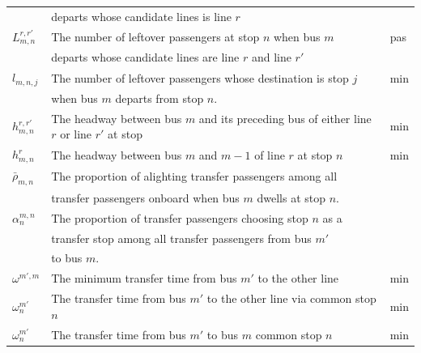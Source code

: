 \documentclass[smallextended]{svjour3}       %
\begin{document}
\begin{Abstract}
\begin{table}[H]
\begin{tabular}{p{1.5cm}p{7cm}p{1.1cm}}
                                    & departs whose candidate lines is line $r$ \\ 
    $L_{m,n}^{r,r'}$                & The number of leftover passengers at stop $n$ when bus $m$                                                         & pas \\
                                    & departs whose candidate lines are line $r$ and line $r'$ \\ 
    $l_{m,n,j}$                     & The number of leftover passengers whose destination is stop $j$                                                    & min \\
                                    & when bus $m$ departs from stop $n$.\\ 
    $h_{m,n}^{r,r'}$                & The headway between bus $m$ and its preceding bus of either line $r$ or line $r'$ at stop                          & min \\ 
    $h_{m,n}^{r}$                   & The headway between bus $m$ and $m-1$ of line $r$ at stop $n$                                                      & min \\ 
    $\bar{\rho}_{m,n}$              & The proportion of alighting transfer passengers among all                                                          &     \\
                                    & transfer passengers onboard when bus $m$ dwells at stop $n$. \\ 
    $\alpha_{n}^{m,n}$              & The proportion of transfer passengers choosing stop $n$ as a                                                       &     \\
                                    & transfer stop among all transfer passengers from bus $m'$ \\
                                    & to bus $m$.\\
    $\omega^{m',m}$                  & The minimum transfer time from bus $m'$ to the other line                                                          & min \\  
    $\omega_{n}^{m'}$               & The transfer time from bus $m'$ to the other line via common stop $n$                                              & min \\ 
    $\omega_{n}^{m'}$               & The transfer time from bus $m'$ to bus $m$ common stop $n$                                                         & min \\ \hline


\end{tabular}
\end{table}
\end{Abstract}
\end{document}
